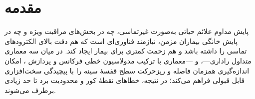 \section{مقدمه}\label{sec:intro-cap3}







پایش مداوم علائم حیاتی به‌صورت غیرتماسی، چه در بخش‌های مراقبت ویژه و چه در پایش خانگی بیماران مزمن، نیازمند فناوری‌ای است که هم دقت بالای الکترودهای تماسی را داشته باشد و هم زحمت کمتری برای بیمار ایجاد کند. در میان سه معماری متداول راداری—،  و —معماری  با ترکیب مدولاسیون خطی فرکانس و پردازش ، امکان اندازه‌گیری همزمان فاصله و ریزحرکت سطح قفسهٔ سینه را با پیچیدگی سخت‌افزاری قابل قبولی فراهم می‌کند؛ در نتیجه، خطاهای نقطهٔ کور  و محدودیت برد  تا حد زیادی برطرف می‌شوند.

